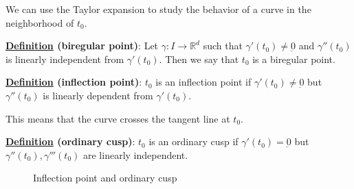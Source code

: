 \documentclass[10pt]{extarticle}
\newcommand{\R}{\mathbb{R}}
\begin{document}
We can use the Taylor expansion to study the behavior of a curve in the neighborhood of $t_0$.


\textbf{\underline{Definition} (biregular point)}:
Let $\gamma: I \to \R^d$ such that $\gamma'(t_0) \ne \underbar{0}$ and $\gamma''(t_0)$ is linearly independent from $\gamma'(t_0)$.
Then we say that $t_0$ is a biregular point.

\textbf{\underline{Definition} (inflection point)}:
$t_0$ is an inflection point if $\gamma'(t_0) \ne \underbar{0}$ but $\gamma''(t_0)$ is linearly dependent from $\gamma'(t_0)$.

This means that the curve crosses the tangent line at $t_0$.


\textbf{\underline{Definition} (ordinary cusp)}:
$t_0$ is an ordinary cusp if $\gamma'(t_0) = \underbar{0}$ but $\gamma''(t_0), \gamma'''(t_0)$ are linearly independent.

\begin{figure}
    \centering
    \caption{Inflection point and ordinary cusp}
    \label{fig:inflection_point_and_ordinary_cusp}
\end{figure}
\end{document}
